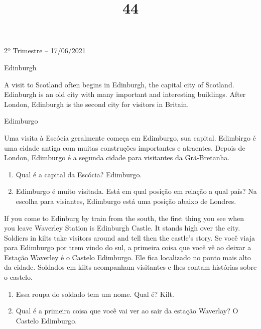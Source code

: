 \documentclass{SchoolBook}
\begin{document}
    \begin{day}{2º Trimestre -- 17/06/2021}
        \begin{multicols}{2}
            \title{4}{Edinburgh}
            
            A visit to Scotland often begins in Edinburgh, the capital city of Scotland. Edinburgh is an old city with many important and interesting buildings. After London, Edinburgh is the second city for visitors in Britain.
            \vfill\columnbreak
            \title{4}{Edimburgo}
            
            Uma visita à Escócia geralmente começa em Edimburgo, sua capital. Edimbirgo é uma cidade antiga com muitas construções importantes e atraentes. Depois de London, Edimburgo é a segunda cidade para visitantes da Grã-Bretanha.
        \end{multicols}
        
        \begin{enumerate}
            \item[1.] Qual é a capital da Escócia?
            \response Edimburgo.
            
            \item[2.] Edimburgo é muito visitada. Está em qual posição em relação a qual país?
            \response Na escolha para visiantes, Edimburgo está uma posição abaixo de Londres.
        \end{enumerate}
        
        \begin{multicols}{2}
            If you come to Edinburg by train from the south, the first thing you see when you leave Waverley Station is Edinburgh Castle. It stands high over the city. Soldiers in kilts take visitors around and tell then the castle's story.
            \vfill\columnbreak
            Se você viaja para Edimburgo por trem vindo do sul, a primeira coisa que você vê ao deixar a Estação Waverley é o Castelo Edimburgo. Ele fica localizado no ponto mais alto da cidade. Soldados em kilts acompanham visitantes e lhes contam histórias sobre o castelo.
        \end{multicols}
        
        \begin{enumerate}
            \item[3.] Essa roupa do soldado tem um nome. Qual é?
            \response Kilt.
            
            \item[4.] Qual é a primeira coisa que você vai ver ao sair da estação Waverlay?
            \response O Castelo Edimburgo.
        \end{enumerate}
        

\end{day}
\end{document}
